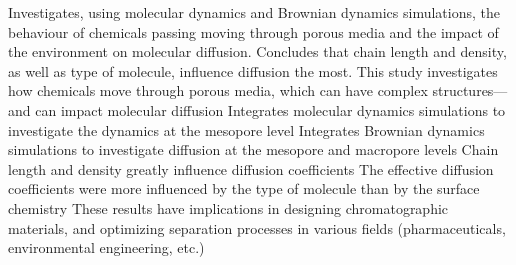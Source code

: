 \markdownRendererDocumentBegin
{} Investigates, using molecular dynamics and Brownian dynamics simulations, the behaviour of chemicals passing moving through porous media and the impact of the environment on molecular diffusion. Concludes that chain length and density, as well as type of molecule, influence diffusion the most.\markdownRendererInterblockSeparator
{}\markdownRendererUlBegin
\markdownRendererUlItem This study investigates how chemicals move through porous media, which can have complex structures—and can impact molecular diffusion\markdownRendererUlItemEnd 
\markdownRendererUlItem Integrates molecular dynamics simulations to investigate the dynamics at the mesopore level\markdownRendererUlItemEnd 
\markdownRendererUlItem Integrates Brownian dynamics simulations to investigate diffusion at the mesopore and macropore levels\markdownRendererUlItemEnd 
\markdownRendererUlItem Chain length and density greatly influence diffusion coefficients\markdownRendererUlItemEnd 
\markdownRendererUlItem The effective diffusion coefficients were more influenced by the type of molecule than by the surface chemistry\markdownRendererUlItemEnd 
\markdownRendererUlItem These results have implications in designing chromatographic materials, and optimizing separation processes in various fields (pharmaceuticals, environmental engineering, etc.)\markdownRendererUlItemEnd 
\markdownRendererUlEnd \markdownRendererDocumentEnd